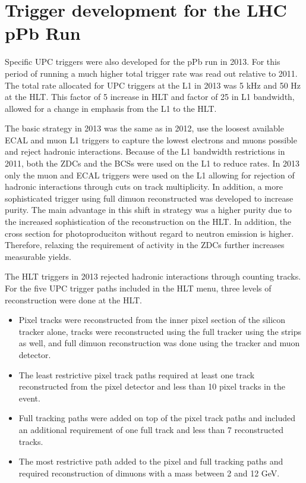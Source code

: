  \section{\label{sec:pPbTrigDev}Trigger development for the LHC pPb Run}
   Specific UPC triggers were also developed for the pPb run in 2013. 
    For this period of running a much higher total trigger rate was read out 
      relative to 2011.
    The total rate allocated for UPC triggers at the L1 in 2013 was 5 kHz and 
      50 Hz at the HLT.
    This factor of 5 increase in HLT and factor of 25 in L1 bandwidth,
      allowed for a change in emphasis from the L1 to the HLT. 

    The basic strategy in 2013 was the same as in 2012, use the loosest 
      available ECAL and muon L1 triggers to capture the lowest \pt{}
      electrons and muons possible and reject hadronic interactions.
    Because of the L1 bandwidth restrictions in 2011, both the ZDCs and the 
      BCSs were used on the L1 to reduce rates.
    In 2013 only the muon and ECAL triggers were used on the L1 allowing for 
      rejection of hadronic interactions through cuts on track multiplicity. 
    In addition, a more sophisticated trigger using full dimuon reconstructed 
      was developed to increase purity.
    The main advantage in this shift in strategy was a higher purity due to 
      the increased sophistication of the reconstruction on the HLT.
    In addition, the cross section for photoproduciton without regard to 
      neutron emission is higher.
    Therefore, relaxing the requirement of activity in the ZDCs further 
      increases measurable yields. 

    The HLT triggers in 2013 rejected hadronic interactions through counting
      tracks. 
    For the five UPC trigger paths included in the HLT menu, 
      three levels of reconstruction were done at the HLT.

    \begin{itemize}
      \item Pixel tracks were reconstructed from the inner pixel section of the 
        silicon tracker alone, tracks were reconstructed using the full
        tracker using the strips as well, and full dimuon reconstruction was 
        done using the tracker and muon detector. 
      \item The least restrictive pixel track paths required at least 
        one track reconstructed from the pixel detector and less than 10 pixel 
        tracks in the event.
      \item Full tracking paths were added on top of the pixel track paths and included
        an additional requirement of one full track and less than 7 reconstructed
        tracks.
      \item The most restrictive path added to the pixel and full tracking paths and 
        required reconstruction of dimuons with a mass between 2 and 12 GeV.
    \end{itemize}

